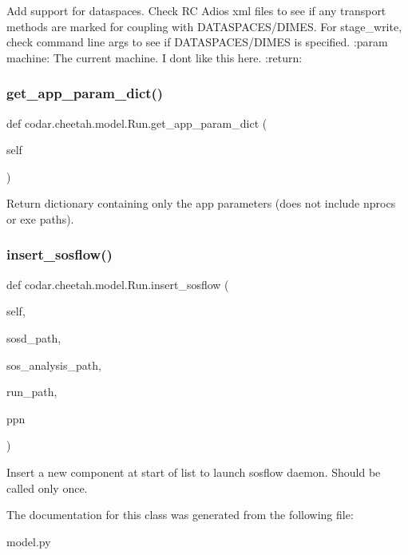 \begin{DoxyVerb}Add support for dataspaces.
Check RC Adios xml files to see if any transport methods are marked
for coupling with DATASPACES/DIMES.
For stage_write, check command line args to see if DATASPACES/DIMES
is specified.
:param machine: The current machine. I dont like this here.
:return:
\end{DoxyVerb}
 \mbox{\label{classcodar_1_1cheetah_1_1model_1_1_run_a30df1617b81f2cfcde9f57d443ca25cb}} 
\subsubsection{\texorpdfstring{get\+\_\+app\+\_\+param\+\_\+dict()}{get\_app\_param\_dict()}}
{\footnotesize\ttfamily def codar.\+cheetah.\+model.\+Run.\+get\+\_\+app\+\_\+param\+\_\+dict (\begin{DoxyParamCaption}\item[{}]{self }\end{DoxyParamCaption})}

\begin{DoxyVerb}Return dictionary containing only the app parameters
(does not include nprocs or exe paths).\end{DoxyVerb}
 \mbox{\label{classcodar_1_1cheetah_1_1model_1_1_run_a8f4284bf79f8b909c4c2d0ef5319e3bc}} 
\subsubsection{\texorpdfstring{insert\+\_\+sosflow()}{insert\_sosflow()}}
{\footnotesize\ttfamily def codar.\+cheetah.\+model.\+Run.\+insert\+\_\+sosflow (\begin{DoxyParamCaption}\item[{}]{self,  }\item[{}]{sosd\+\_\+path,  }\item[{}]{sos\+\_\+analysis\+\_\+path,  }\item[{}]{run\+\_\+path,  }\item[{}]{ppn }\end{DoxyParamCaption})}

\begin{DoxyVerb}Insert a new component at start of list to launch sosflow daemon.
Should be called only once.\end{DoxyVerb}
 

The documentation for this class was generated from the following file\+:\begin{DoxyCompactItemize}
\item 
model.\+py\end{DoxyCompactItemize}

